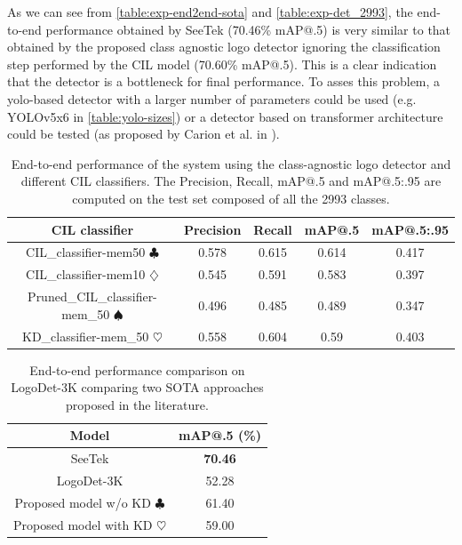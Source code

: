 As we can see from \autoref{table:exp-end2end-sota} and \autoref{table:exp-det_2993}, the end-to-end performance obtained by SeeTek (70.46\% mAP@.5) is very similar to that obtained by the proposed class agnostic logo detector ignoring the classification step performed by the CIL model (70.60\% mAP@.5). This is a clear indication that the detector is a bottleneck for final performance. To asses this problem, a yolo-based detector with a larger number of parameters could be used (e.g. YOLOv5x6 in \autoref{table:yolo-sizes}) or a detector based on transformer architecture could be tested (as proposed by Carion et al. in \cite{carion2020end}).

\begin{table}[H]
    \centering
    \begin{tabular}{c|c|c|c|c}
        \hline
        \textbf{CIL classifier} &
        \textbf{Precision} &
        \textbf{Recall} &
        \textbf{mAP@.5} &
        \textbf{mAP@.5:.95} \\
        \hline
        \hline
CIL\_classifier-mem50 $\clubsuit$&0.578&0.615&0.614&0.417\\
CIL\_classifier-mem10 $\diamondsuit$&0.545&0.591&0.583&0.397\\
Pruned\_CIL\_classifier-mem\_50 $\spadesuit$&0.496&0.485&0.489&0.347\\
KD\_classifier-mem\_50 $\heartsuit$&0.558&0.604&0.59&0.403\\
\hline
\end{tabular}
\caption{End-to-end performance of the system using the class-agnostic logo detector and different CIL classifiers. The Precision, Recall, mAP@.5 and mAP@.5:.95 are computed on the test set composed of all the 2993 classes.}
    \label{table:exp-end2end}
\end{table}


\begin{table}[H]
    \centering
    \begin{tabular}{c|c}
        \hline
        \textbf{Model} &
        \textbf{mAP@.5 (\%)}\\
        \hline
        \hline
SeeTek \cite{li2022seetek}&\textbf{70.46}\\
LogoDet-3K \cite{wang2022logodet}&52.28\\
\hline
Proposed model w/o KD $\clubsuit$&61.40\\
Proposed model with KD $\heartsuit$&59.00\\
\hline
\end{tabular}
\caption{End-to-end performance comparison on LogoDet-3K comparing two SOTA approaches proposed in the literature.}
    \label{table:exp-end2end-sota}
\end{table}

